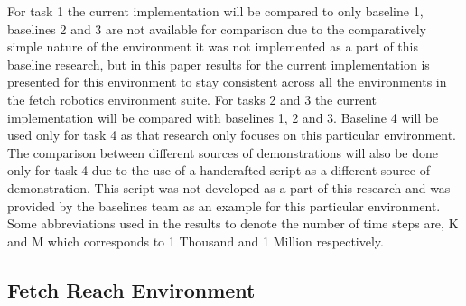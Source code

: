 For task 1 the current implementation will be compared to only baseline 1, baselines 2 and 3 are not available for comparison due to the comparatively simple nature of the environment it was not implemented as a part of this baseline research, but in this paper results for the current implementation is presented for this environment to stay consistent across all the environments in the fetch robotics environment suite. For tasks 2 and 3 the current implementation will be compared with baselines 1, 2 and 3. Baseline 4 will be used only for task 4 as that research only focuses on this particular environment. The comparison between different sources of demonstrations will also be done only for task 4 due to the use of a handcrafted script as a different source of demonstration. This script was not developed as a part of this research and was provided by the baselines team \cite{stable-baselines} as an example for this particular environment. \\

Some abbreviations used in the results to denote the number of time steps are, K and M which corresponds to 1 Thousand and 1 Million respectively. \\

\subsection{Fetch Reach Environment}

